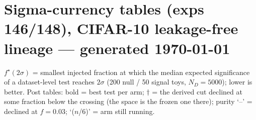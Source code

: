\documentclass[10pt]{article}
\begin{document}
\section*{Sigma-currency tables (exps 146/148), CIFAR-10 leakage-free lineage --- generated \today}
\noindent $f^\star(2\sigma)$ = smallest injected fraction at which the median expected significance of a dataset-level test reaches $2\sigma$ (200 null / 50 signal toys, $N_D{=}5000$); lower is better. Post tables: bold = best test per arm; $\dagger$ = the derived cut declined at some fraction below the crossing (the space is the frozen one there); purity `--' = declined at $f{=}0.03$; `($n$/6)' = arm still running.


\clearpage







\clearpage



\clearpage



\clearpage



\clearpage



\clearpage




\clearpage


\clearpage


\clearpage


\clearpage





\end{document}

